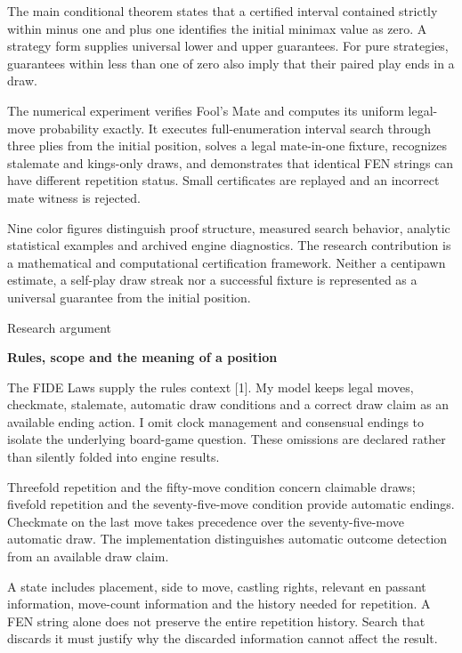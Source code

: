 \documentclass[10pt]{article}
\begin{document}
The main conditional theorem states that a certified interval contained strictly within minus one and plus one identifies the initial minimax value as zero. A strategy form supplies universal lower and upper guarantees. For pure strategies, guarantees within less than one of zero also imply that their paired play ends in a draw.\par
The numerical experiment verifies Fool's Mate and computes its uniform legal-move probability exactly. It executes full-enumeration interval search through three plies from the initial position, solves a legal mate-in-one fixture, recognizes stalemate and kings-only draws, and demonstrates that identical FEN strings can have different repetition status. Small certificates are replayed and an incorrect mate witness is rejected.\par
Nine color figures distinguish proof structure, measured search behavior, analytic statistical examples and archived engine diagnostics. The research contribution is a mathematical and computational certification framework. Neither a centipawn estimate, a self-play draw streak nor a successful fixture is represented as a universal guarantee from the initial position.\par
\clearpage
{\small\color{accent}Research argument}\par
{\LARGE\bfseries\color{ink}Rules, scope and the meaning of a position}\par\vspace{7pt}
The FIDE Laws supply the rules context [1]. My model keeps legal moves, checkmate, stalemate, automatic draw conditions and a correct draw claim as an available ending action. I omit clock management and consensual endings to isolate the underlying board-game question. These omissions are declared rather than silently folded into engine results.\par
Threefold repetition and the fifty-move condition concern claimable draws; fivefold repetition and the seventy-five-move condition provide automatic endings. Checkmate on the last move takes precedence over the seventy-five-move automatic draw. The implementation distinguishes automatic outcome detection from an available draw claim.\par
A state includes placement, side to move, castling rights, relevant en passant information, move-count information and the history needed for repetition. A FEN string alone does not preserve the entire repetition history. Search that discards it must justify why the discarded information cannot affect the result.\par
\end{document}
